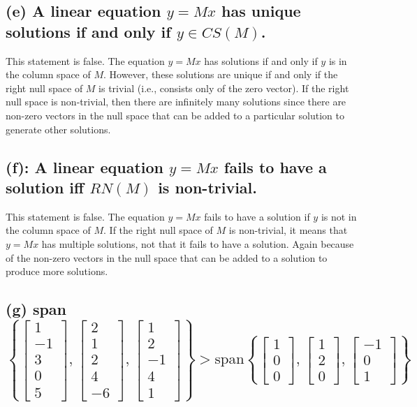 \documentclass{article}
\begin{document}
\subsection*{(e) A linear equation $y = Mx$ has unique solutions if and only if $y \in CS(M)$.}

This statement is false. The equation $y = Mx$ has solutions if and only if $y$ is in the column space of $M$. However, these solutions are unique if and only if the right null space of $M$ is trivial (i.e., consists only of the zero vector). If the right null space is non-trivial, then there are infinitely many solutions since there are non-zero vectors in the null space that can be added to a particular solution to generate other solutions.

\subsection*{(f): A linear equation \(y = Mx\) fails to have a solution iff \(RN(M)\) is non-trivial.}
This statement is false. The equation $y = Mx$ fails to have a solution if $y$ is not in the column space of $M$. If the right null space of $M$ is non-trivial, it means that $y = Mx$ has multiple solutions, not that it fails to have a solution. Again because of the non-zero vectors in the null space that can be added to a solution to produce more solutions.

\subsection*{(g) span\(\left\{ 
    \begin{bmatrix} 
    1 \\ -1 \\ 3 \\ 0 \\ 5 
    \end{bmatrix}, 
    \begin{bmatrix} 
    2 \\ 1 \\ 2 \\ 4 \\ -6 
    \end{bmatrix}, 
    \begin{bmatrix} 
    1 \\ 2 \\ -1 \\ 4 \\ 1 
    \end{bmatrix} 
    \right\} > \text{span}\left\{
    \begin{bmatrix} 
    1 \\ 0 \\ 0 
    \end{bmatrix}, 
    \begin{bmatrix} 
    1 \\ 2 \\ 0 
    \end{bmatrix}, 
    \begin{bmatrix} 
    -1 \\ 0 \\ 1 
    \end{bmatrix} 
    \right\}\)}
\end{document}
